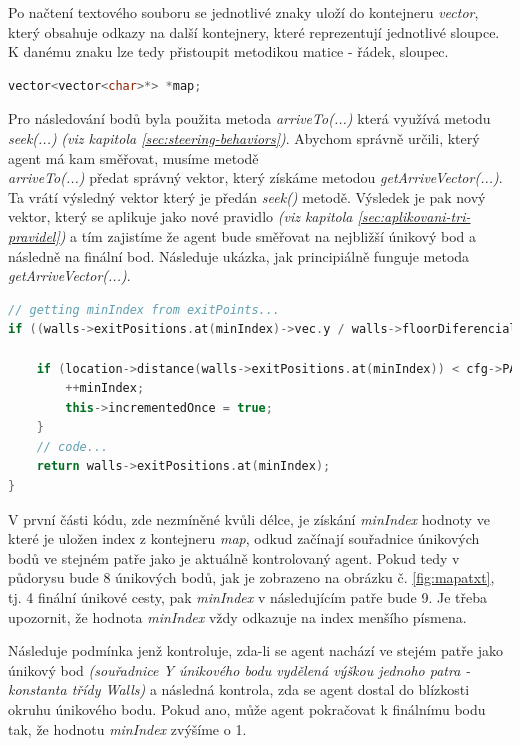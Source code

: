 \documentclass[czech,public,dept460,male,cpdeclaration]{diploma}
\begin{document}
Po načtení textového souboru se jednotlivé znaky uloží do kontejneru \textit{vector}, který obsahuje odkazy na další kontejnery, které reprezentují jednotlivé sloupce. K danému znaku lze tedy přistoupit metodikou matice \cite{linkToMatrix} - řádek, sloupec.
\begin{lstlisting}[language=c++,label=src:mapSave,caption=Způsob uložení mapy v paměti]
vector<vector<char>*> *map;
\end{lstlisting}

Pro následování bodů byla použita metoda \textit{arriveTo(...)} která využívá metodu \textit{seek(...)} \textit{(viz kapitola \ref{sec:steering-behaviors})}. Abychom správně určili, který agent má kam směřovat, musíme metodě\\ \textit{arriveTo(...)} předat správný vektor, který získáme metodou \textit{getArriveVector(...)}. Ta vrátí výsledný vektor který je předán \textit{seek()} metodě. Výsledek je pak nový vektor, který se aplikuje jako nové pravidlo \textit{(viz kapitola \ref{sec:aplikovani-tri-pravidel})} a tím zajistíme že agent bude směřovat na nejbližší únikový bod a následně na finální bod. 
Následuje ukázka, jak principiálně funguje metoda \textit{getArriveVector(...)}.

\begin{lstlisting}[language=c++,label=src:mapSave,caption=Princip metody getArriveVector(...)]
// getting minIndex from exitPoints...
if ((walls->exitPositions.at(minIndex)->vec.y / walls->floorDiferencial) == this->floor) {
	
	if (location->distance(walls->exitPositions.at(minIndex)) < cfg->PATH_TO_FIND_RADIUS && !this->incrementedOnce) {
		++minIndex;
		this->incrementedOnce = true;
	}
	// code...
	return walls->exitPositions.at(minIndex);
}
\end{lstlisting}

V první části kódu, zde nezmíněné kvůli délce, je získání \textit{minIndex} hodnoty ve které je uložen index z kontejneru \textit{map}, odkud začínají souřadnice únikových bodů ve stejném patře jako je aktuálně kontrolovaný agent. Pokud tedy v půdorysu bude 8 únikových bodů, jak je zobrazeno na obrázku č. \ref{fig:mapatxt}, tj. 4 finální únikové cesty, pak \textit{minIndex} v následujícím patře bude 9. Je třeba upozornit, že hodnota \textit{minIndex} vždy odkazuje na index menšího písmena.

Následuje podmínka jenž kontroluje, zda-li se agent nachází ve stejém patře jako únikový bod \textit{(souřadnice Y únikového bodu vydělená výškou jednoho patra - konstanta třídy Walls)} a následná kontrola, zda se agent dostal do blízkosti okruhu únikového bodu. Pokud ano, může agent pokračovat k finálnímu bodu tak, že hodnotu \textit{minIndex} zvýšíme o 1.
\end{document}
